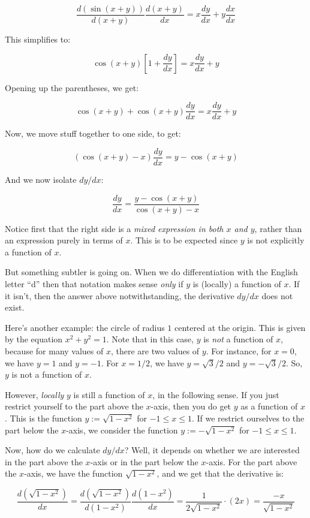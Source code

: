\documentclass[10pt]{amsart}
\begin{document}
$$\frac{d(\sin(x + y))}{d(x + y)} \frac{d(x + y)}{dx} = x \frac{dy}{dx} + y \frac{dx}{dx}$$

This simplifies to:

$$ \cos (x + y) \left[1 + \frac{dy}{dx}\right] = x \frac{dy}{dx} + y$$

Opening up the parentheses, we get:

$$\cos(x + y) + \cos(x + y) \frac{dy}{dx} = x \frac{dy}{dx} + y$$

Now, we move stuff together to one side, to get:

$$(\cos(x + y) - x)\frac{dy}{dx} = y - \cos(x + y)$$

And we now isolate $dy/dx$:

$$\frac{dy}{dx} = \frac{y - \cos(x + y)}{\cos(x + y) - x}$$

Notice first that the right side is a {\em mixed expression in both
$x$ and $y$}, rather than an expression purely in terms of $x$. This
is to be expected since $y$ is not explicitly a function of $x$. 

But something subtler is going on. When we do differentiation with the
English letter ``d'' then that notation makes sense {\em only} if $y$
is (locally) a function of $x$. If it isn't, then the answer above
notwithstanding, the derivative $dy/dx$ does not exist.

Here's another example: the circle of radius $1$ centered at the
origin. This is given by the equation $x^2 + y^2 = 1$. Note that in
this case, $y$ is {\em not} a function of $x$, because for many values
of $x$, there are two values of $y$. For instance, for $x = 0$, we
have $y = 1$ and $y = -1$. For $x = 1/2$, we have $y = \sqrt{3}/2$ and
$y = -\sqrt{3}/2$. So, $y$ is not a function of $x$.

However, {\em locally} $y$ is still a function of $x$, in the
following sense. If you just restrict yourself to the part above the
$x$-axis, then you do get $y$ as a function of $x$. This is the
function $y := \sqrt{1 - x^2}$ for $-1 \le x \le 1$.  If we restrict
ourselves to the part below the $x$-axis, we consider the function $y
:= -\sqrt{1 - x^2}$ for $-1 \le x \le 1$.

Now, how do we calculate $dy/dx$? Well, it depends on whether we are
interested in the part above the $x$-axis or in the part below the
$x$-axis. For the part above the $x$-axis, we have the function
$\sqrt{1 - x^2}$, and we get that the derivative is:

$$\frac{d(\sqrt{1 - x^2})}{dx} = \frac{d(\sqrt{1 - x^2})}{d(1 - x^2)} \frac{d(1 - x^2)}{dx} = \frac{1}{2\sqrt{1 - x^2}} \cdot (2x) = \frac{-x}{\sqrt{1 - x^2}}$$
\end{document}

